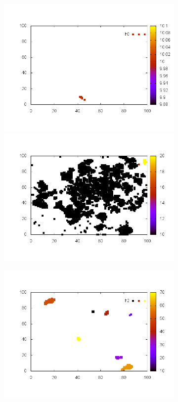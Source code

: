 \documentclass[10pt,a4paper]{article}
\begin{document}
\begin{figure}
\centering
\begin{subfigure}[b]{1\textwidth}
\includegraphics[scale=.5]{./img/stampe/scc1/0.png}
\includegraphics[scale=.5]{./img/stampe/scc1/1.png}
\end{subfigure}
\begin{subfigure}[b]{1\textwidth}
\includegraphics[scale=.5]{./img/stampe/scc1/2.png}

\end{subfigure}
\end{figure}
\end{document}
